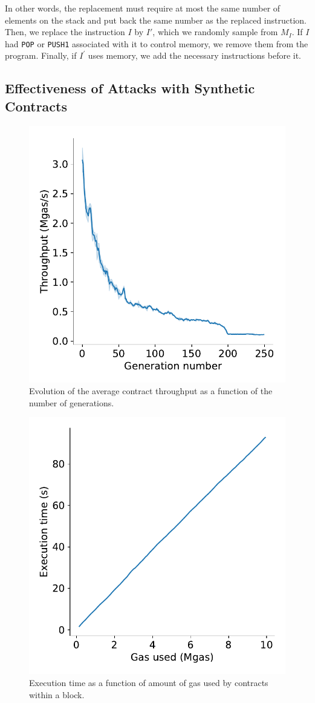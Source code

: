 In other words, the replacement must require at most the same number of elements on the stack and put back the same number as the replaced instruction. Then, we replace the instruction $I$ by $I'$, which we randomly sample from $M_I$. If $I$ had \lstinline{POP} or \lstinline{PUSH1} associated with it to control memory, we remove them from the program. Finally, if $I^\prime$ uses memory, we add the necessary instructions before it.

\subsection{Effectiveness of Attacks with Synthetic Contracts}
\begin{figure}[tb]
    \centering
    \includegraphics[width=.8\columnwidth]{./3-vm-security/figures/ga-contract-gas-results.pdf}
    \caption{Evolution of the average contract throughput as a function of the number of generations.}
    \label{fig:throughput-evolution}
\end{figure}

\begin{figure}[tb]
    \centering
    \includegraphics[width=.7\columnwidth]{./3-vm-security/figures/block-execution-time.pdf}
    \caption{Execution time as a function of amount of gas used by contracts within a block.}
    \label{fig:block-exec-speed}
\end{figure}

